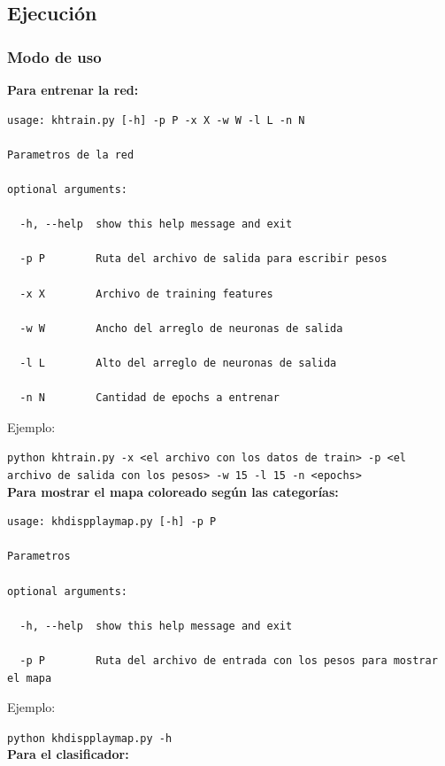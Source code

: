 \subsection{Ejecución}

\subsubsection{Modo de uso}

\textbf{Para entrenar la red:}

\begin{lstlisting}[style=bash]
usage: khtrain.py [-h] -p P -x X -w W -l L -n N

Parametros de la red

optional arguments:

  -h, --help  show this help message and exit

  -p P        Ruta del archivo de salida para escribir pesos

  -x X        Archivo de training features

  -w W        Ancho del arreglo de neuronas de salida

  -l L        Alto del arreglo de neuronas de salida

  -n N        Cantidad de epochs a entrenar
\end{lstlisting}

Ejemplo: 

\noindent\texttt{python khtrain.py -x <el archivo con los datos de train> -p <el archivo de salida con los pesos> -w 15 -l 15 -n <epochs>} \\

\textbf{Para mostrar el mapa coloreado según las categorías:}

\begin{lstlisting}[style=bash]
usage: khdispplaymap.py [-h] -p P

Parametros

optional arguments:

  -h, --help  show this help message and exit

  -p P        Ruta del archivo de entrada con los pesos para mostrar el mapa

\end{lstlisting}

Ejemplo:

\noindent\texttt{python khdispplaymap.py -h} \\


\textbf{Para el clasificador:}

